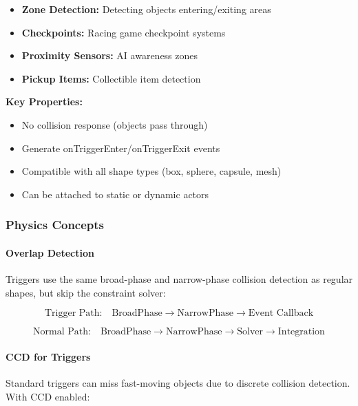 \begin{itemize}
    \item \textbf{Zone Detection:} Detecting objects entering/exiting areas
    \item \textbf{Checkpoints:} Racing game checkpoint systems
    \item \textbf{Proximity Sensors:} AI awareness zones
    \item \textbf{Pickup Items:} Collectible item detection
\end{itemize}

\textbf{Key Properties:}
\begin{itemize}
    \item No collision response (objects pass through)
    \item Generate onTriggerEnter/onTriggerExit events
    \item Compatible with all shape types (box, sphere, capsule, mesh)
    \item Can be attached to static or dynamic actors
\end{itemize}

\subsubsection{Physics Concepts}

\paragraph{Overlap Detection}

Triggers use the same broad-phase and narrow-phase collision detection as regular shapes, but skip the constraint solver:

\begin{equation}
\text{Trigger Path:} \quad \text{BroadPhase} \rightarrow \text{NarrowPhase} \rightarrow \text{Event Callback}
\end{equation}

\begin{equation}
\text{Normal Path:} \quad \text{BroadPhase} \rightarrow \text{NarrowPhase} \rightarrow \text{Solver} \rightarrow \text{Integration}
\end{equation}

\paragraph{CCD for Triggers}

Standard triggers can miss fast-moving objects due to discrete collision detection. With CCD enabled:

